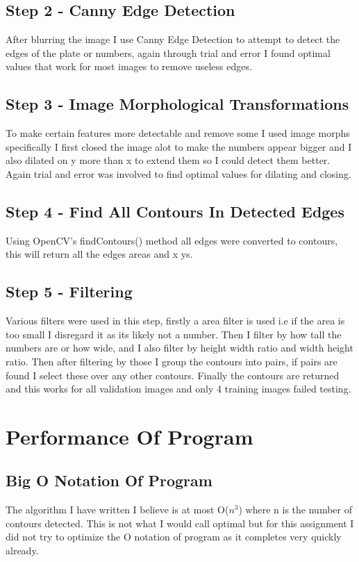 \documentclass[conference]{IEEEtran}
\begin{document}
\subsection{Step 2 - Canny Edge Detection}
After blurring the image I use Canny Edge Detection to attempt to detect the edges of the plate or numbers, again through
trial and error I found optimal values that work for most images to remove useless edges.
\subsection{Step 3 - Image Morphological Transformations}
To make certain features more detectable and remove some I used image morphs specifically I first closed the image alot to
make the numbers appear bigger and I also dilated on y more than x to extend them so I could detect them better. Again trial
and error was involved to find optimal values for dilating and closing.
\subsection{Step 4 - Find All Contours In Detected Edges}
Using OpenCV's findContours() method all edges were converted to contours, this will return all the edges areas and x ys.
\subsection{Step 5 - Filtering}
Various filters were used in this step, firstly a area filter is used i.e if the area is too small I disregard it as its
likely not a number. Then I filter by how tall the numbers are or how wide, and I also filter by height width ratio and width
height ratio.
Then after filtering by those I group the contours into pairs, if pairs are found I select these over any other contours.
Finally the contours are returned and this works for all validation images and only 4 training images failed testing.

\section{Performance Of Program}
\subsection{Big O Notation Of Program}
The algorithm I have written I believe is at most O($n^{3}$) where n is the number of contours detected. This is not
what I would call optimal but for this assignment I did not try to optimize the O notation of program as it completes
very quickly already.
\end{document}
